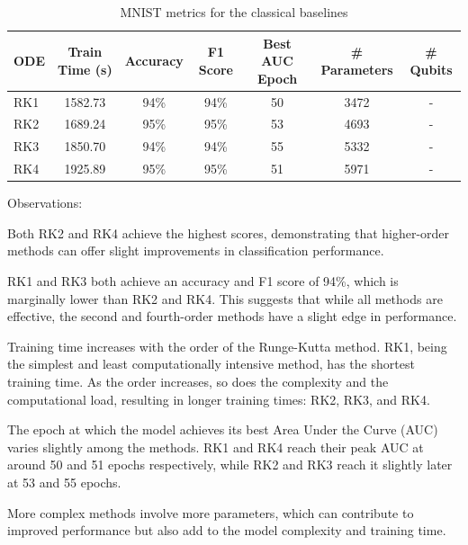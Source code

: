 \documentclass[12pt,a4paper]{report}
\begin{document}
\begin{table}[th]\small\linespread{1}
  \label{tab:classical_MNIST_3}
  \centering
  \begin{tabular}{|l|c|c|c|c|c|c|}
    \hline
    \textbf{ODE} & \textbf{Train Time (s)} & \textbf{Accuracy} & \textbf{F1 Score} & \textbf{Best AUC Epoch} & \textbf{\# Parameters} & \textbf{\# Qubits} \\
    \hline
    RK1          & 1582.73                 & 94\%              & 94\%              & 50                      & 3472                   & -                  \\
    RK2          & 1689.24                 & 95\%              & 95\%              & 53                      & 4693                   & -                  \\
    RK3          & 1850.70                 & 94\%              & 94\%              & 55                      & 5332                   & -                  \\
    RK4          & 1925.89                 & 95\%              & 95\%              & 51                      & 5971                   & -                  \\
    \hline
  \end{tabular}
  \caption{MNIST metrics for the classical baselines}
\end{table}

Observations:

Both RK2 and RK4 achieve the highest scores, demonstrating that higher-order methods can offer slight improvements in classification performance.

RK1 and RK3 both achieve an accuracy and F1 score of 94\%, which is marginally lower than RK2 and RK4. This suggests that while all methods are effective, the second and fourth-order methods have a slight edge in performance.

Training time increases with the order of the Runge-Kutta method. RK1, being the simplest and least computationally intensive method, has the shortest training time. As the order increases, so does the complexity and the computational load, resulting in longer training times: RK2, RK3, and RK4.

The epoch at which the model achieves its best Area Under the Curve (AUC) varies slightly among the methods. RK1 and RK4 reach their peak AUC at around 50 and 51 epochs respectively, while RK2 and RK3 reach it slightly later at 53 and 55 epochs.

More complex methods involve more parameters, which can contribute to improved performance but also add to the model complexity and training time.
\end{document}
